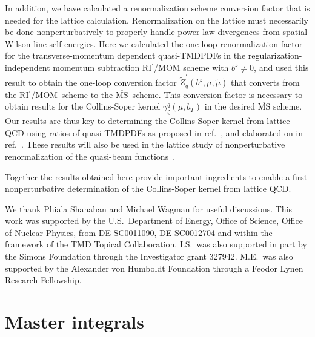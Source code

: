 \documentclass[11pt,a4paper]{article}
\DeclareRobustCommand{\mycite}[1]{ref.~\cite{#1}}
\newcommand{\MS}{{\overline{\mathrm{MS}}}}
\newcommand{\RIpMOM}{RI$^\prime$/MOM}
\begin{document}
In addition, we have calculated a renormalization scheme conversion factor that is needed for the lattice calculation. Renormalization on the lattice must necessarily be done nonperturbatively to properly handle power law divergences from spatial Wilson line self energies. Here
we calculated the one-loop renormalization factor for the transverse-momentum dependent quasi-TMDPDFs
in the regularization-independent momentum subtraction RI$^\prime$/MOM scheme with $b^z\ne 0$, and used this result to obtain
the one-loop conversion factor $\tilde Z_q^\prime(b^z,\mu,\tilde \mu)$ that converts from the \RIpMOM~scheme to the $\MS$~scheme.
This conversion factor is necessary to obtain results for the Collins-Soper kernel $\gamma_\zeta^q(\mu,b_T)$ in the desired $\MS$ scheme. Our results are thus key to determining the Collins-Soper kernel
from lattice QCD using ratios of quasi-TMDPDFs as proposed in \mycite{Ebert:2018gzl}, and elaborated on in \mycite{Ebert:2019okf}.
These results will also be used in the lattice study of nonperturbative renormalization of the quasi-beam functions~\cite{Shanahan:2019zcq}.

Together the results obtained here provide important ingredients to enable a first nonperturbative
determination of the Collins-Soper kernel from lattice QCD.




\begin{acknowledgments}
We thank Phiala Shanahan and Michael Wagman for useful discussions.
This work was supported by the U.S.\ Department of Energy, Office of Science,
Office of Nuclear Physics, from DE-SC0011090, DE-SC0012704
and within the framework of the TMD Topical Collaboration.
I.S.\ was also supported in part by the Simons Foundation through
the Investigator grant 327942.
M.E.\ was also supported by the Alexander von Humboldt Foundation
through a Feodor Lynen Research Fellowship.

\end{acknowledgments}

\appendix

\section{Master integrals}
\label{app:master_integrals}
\end{document}
